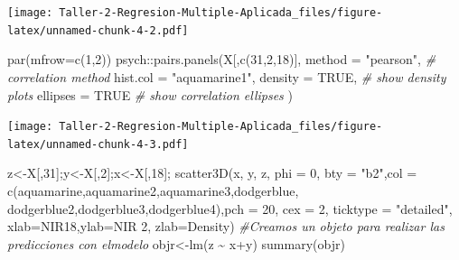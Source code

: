 \documentclass[
]{article}
\newenvironment{Shaded}{\begin{snugshade}}{\end{snugshade}}
\newcommand{\AttributeTok}[1]{\textcolor[rgb]{0.77,0.63,0.00}{#1}}
\newcommand{\CommentTok}[1]{\textcolor[rgb]{0.56,0.35,0.01}{\textit{#1}}}
\newcommand{\ConstantTok}[1]{\textcolor[rgb]{0.00,0.00,0.00}{#1}}
\newcommand{\DecValTok}[1]{\textcolor[rgb]{0.00,0.00,0.81}{#1}}
\newcommand{\FunctionTok}[1]{\textcolor[rgb]{0.00,0.00,0.00}{#1}}
\newcommand{\NormalTok}[1]{#1}
\newcommand{\OtherTok}[1]{\textcolor[rgb]{0.56,0.35,0.01}{#1}}
\newcommand{\SpecialCharTok}[1]{\textcolor[rgb]{0.00,0.00,0.00}{#1}}
\newcommand{\StringTok}[1]{\textcolor[rgb]{0.31,0.60,0.02}{#1}}
\begin{document}
\texttt{[image: Taller-2-Regresion-Multiple-Aplicada\_files/figure-latex/unnamed-chunk-4-2.pdf]}

\begin{Shaded}
\begin{Highlighting}[]
\FunctionTok{par}\NormalTok{(}\AttributeTok{mfrow=}\FunctionTok{c}\NormalTok{(}\DecValTok{1}\NormalTok{,}\DecValTok{2}\NormalTok{))}
\NormalTok{psych}\SpecialCharTok{::}\FunctionTok{pairs.panels}\NormalTok{(X[,}\FunctionTok{c}\NormalTok{(}\DecValTok{31}\NormalTok{,}\DecValTok{2}\NormalTok{,}\DecValTok{18}\NormalTok{)], }
                      \AttributeTok{method =} \StringTok{"pearson"}\NormalTok{, }\CommentTok{\# correlation method}
                      \AttributeTok{hist.col =} \StringTok{"aquamarine1"}\NormalTok{,}
                      \AttributeTok{density =} \ConstantTok{TRUE}\NormalTok{,  }\CommentTok{\# show density plots}
                      \AttributeTok{ellipses =} \ConstantTok{TRUE} \CommentTok{\# show correlation ellipses}
\NormalTok{  )}
\end{Highlighting}
\end{Shaded}

\texttt{[image: Taller-2-Regresion-Multiple-Aplicada\_files/figure-latex/unnamed-chunk-4-3.pdf]}

\begin{Shaded}
\begin{Highlighting}[]
\NormalTok{z}\OtherTok{\textless{}{-}}\NormalTok{X[,}\DecValTok{31}\NormalTok{];y}\OtherTok{\textless{}{-}}\NormalTok{X[,}\DecValTok{2}\NormalTok{];x}\OtherTok{\textless{}{-}}\NormalTok{X[,}\DecValTok{18}\NormalTok{];}
\FunctionTok{scatter3D}\NormalTok{(x, y, z, }\AttributeTok{phi =} \DecValTok{0}\NormalTok{, }\AttributeTok{bty =} \StringTok{"b2"}\NormalTok{,}\AttributeTok{col =} \FunctionTok{c}\NormalTok{(}\StringTok{\textquotesingle{}aquamarine\textquotesingle{}}\NormalTok{,}\StringTok{\textquotesingle{}aquamarine2\textquotesingle{}}\NormalTok{,}\StringTok{\textquotesingle{}aquamarine3\textquotesingle{}}\NormalTok{,}\StringTok{\textquotesingle{}dodgerblue\textquotesingle{}}\NormalTok{,}
\StringTok{\textquotesingle{}dodgerblue2\textquotesingle{}}\NormalTok{,}\StringTok{\textquotesingle{}dodgerblue3\textquotesingle{}}\NormalTok{,}\StringTok{\textquotesingle{}dodgerblue4\textquotesingle{}}\NormalTok{),}\AttributeTok{pch =} \DecValTok{20}\NormalTok{, }\AttributeTok{cex =} \DecValTok{2}\NormalTok{,}
\AttributeTok{ticktype =} \StringTok{"detailed"}\NormalTok{,}
\AttributeTok{xlab=}\StringTok{\textquotesingle{}NIR18\textquotesingle{}}\NormalTok{,}\AttributeTok{ylab=}\StringTok{\textquotesingle{}NIR 2\textquotesingle{}}\NormalTok{, }\AttributeTok{zlab=}\StringTok{\textquotesingle{}Density\textquotesingle{}}\NormalTok{)}
\CommentTok{\#Creamos un objeto para realizar las predicciones con elmodelo}
\NormalTok{objr}\OtherTok{\textless{}{-}}\FunctionTok{lm}\NormalTok{(z }\SpecialCharTok{\textasciitilde{}}\NormalTok{ x}\SpecialCharTok{+}\NormalTok{y)}
\FunctionTok{summary}\NormalTok{(objr)}
\end{Highlighting}
\end{Shaded}
\end{document}
